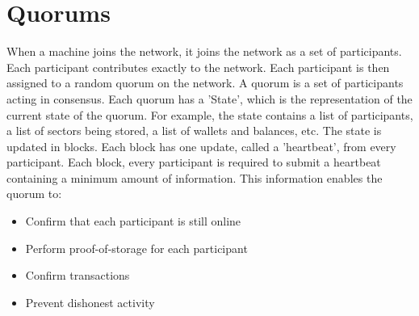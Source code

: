 \documentclass[twocolumn]{article}
\begin{document}

\section{Quorums}

When a machine joins the network, it joins the network as a set of participants.
Each participant contributes exactly \participantvolume{} to the network.
Each participant is then assigned to a random quorum on the network.
A quorum is a set of \quorumsize{} participants acting in consensus.
Each quorum has a 'State', which is the representation of the current state of the quorum.
For example, the state contains a list of participants, a list of sectors being stored, a list of wallets and balances, etc.
The state is updated in blocks.
Each block has one update, called a 'heartbeat', from every participant.
Each block, every participant is required to submit a heartbeat containing a minimum amount of information.
This information enables the quorum to:
\begin{itemize}
	\item Confirm that each participant is still online
	\item Perform proof-of-storage for each participant
	\item Confirm transactions
	\item Prevent dishonest activity
\end{itemize}
\end{document}

